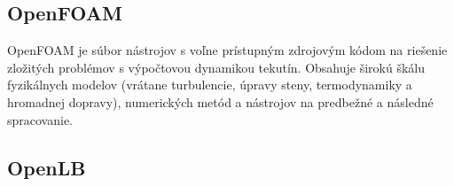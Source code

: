\documentclass[]{tukediphc}
\begin{document}
\subsection{OpenFOAM}

OpenFOAM je súbor nástrojov s voľne prístupným zdrojovým kódom na riešenie zložitých problémov s výpočtovou dynamikou tekutín. Obsahuje širokú škálu fyzikálnych modelov (vrátane turbulencie, úpravy steny, termodynamiky a hromadnej dopravy), numerických metód a nástrojov na predbežné a následné spracovanie.

\subsection{OpenLB}

%

%
\end{document}
